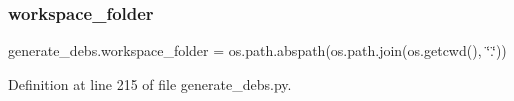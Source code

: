 \mbox{\label{namespacegenerate__debs_acb69863b90257249a30e43ebacfb8bd8}} 
\subsubsection{\texorpdfstring{workspace\+\_\+folder}{workspace\_folder}}
{\footnotesize\ttfamily generate\+\_\+debs.\+workspace\+\_\+folder = os.\+path.\+abspath(os.\+path.\+join(os.\+getcwd(), \char`\"{}.\char`\"{}))}



Definition at line 215 of file generate\+\_\+debs.\+py.

